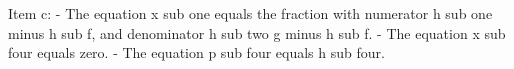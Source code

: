Item c:
- The equation x sub one equals the fraction with numerator h sub one minus h sub f, and denominator h sub two g minus h sub f.
- The equation x sub four equals zero.
- The equation p sub four equals h sub four.